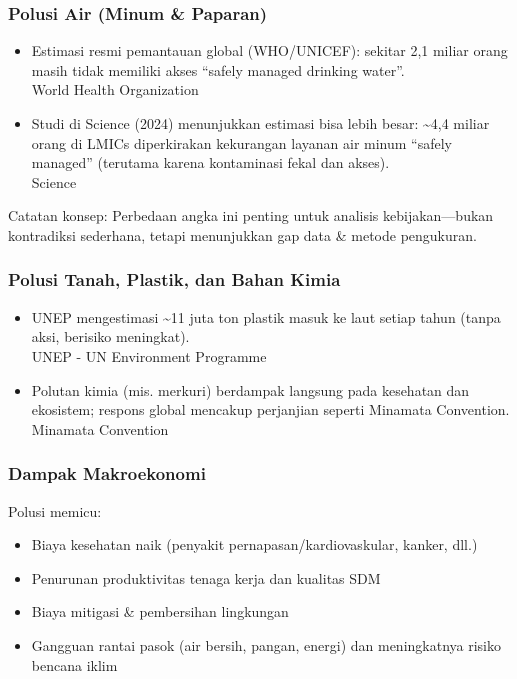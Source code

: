 \documentclass[
  letterpaper,
  DIV=11,
  numbers=noendperiod]{scrreprt}
\providecommand{\tightlist}{%
  \setlength{\itemsep}{0pt}\setlength{\parskip}{0pt}}
\begin{document}
\subsubsection{Polusi Air (Minum \&
Paparan)}\label{polusi-air-minum-paparan}

\begin{itemize}
\item
  Estimasi resmi pemantauan global (WHO/UNICEF): sekitar 2,1 miliar
  orang masih tidak memiliki akses ``safely managed drinking water''.\\
  World Health Organization
\item
  Studi di Science (2024) menunjukkan estimasi bisa lebih besar:
  \textasciitilde4,4 miliar orang di LMICs diperkirakan kekurangan
  layanan air minum ``safely managed'' (terutama karena kontaminasi
  fekal dan akses).\\
  Science
\end{itemize}

Catatan konsep: Perbedaan angka ini penting untuk analisis
kebijakan---bukan kontradiksi sederhana, tetapi menunjukkan gap data \&
metode pengukuran.

\subsubsection{Polusi Tanah, Plastik, dan Bahan
Kimia}\label{polusi-tanah-plastik-dan-bahan-kimia}

\begin{itemize}
\item
  UNEP mengestimasi \textasciitilde11 juta ton plastik masuk ke laut
  setiap tahun (tanpa aksi, berisiko meningkat).\\
  UNEP - UN Environment Programme
\item
  Polutan kimia (mis. merkuri) berdampak langsung pada kesehatan dan
  ekosistem; respons global mencakup perjanjian seperti Minamata
  Convention.\\
  Minamata Convention
\end{itemize}

\subsubsection{Dampak Makroekonomi}\label{dampak-makroekonomi}

Polusi memicu:

\begin{itemize}
\tightlist
\item
  Biaya kesehatan naik (penyakit pernapasan/kardiovaskular, kanker,
  dll.)
\item
  Penurunan produktivitas tenaga kerja dan kualitas SDM
\item
  Biaya mitigasi \& pembersihan lingkungan
\item
  Gangguan rantai pasok (air bersih, pangan, energi) dan meningkatnya
  risiko bencana iklim
\end{itemize}
\end{document}
